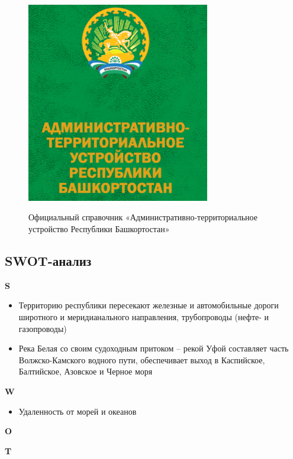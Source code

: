 \begin{figure}[h!]
	\begin{center}
		{\includegraphics[width=80mm]{pics/alina/spravka.png}}
		\caption{Официальный справочник «Административно-территориальное устройство Республики Башкортостан»}
	\end{center}
\end{figure}

\newpage

\subsection{SWOT-анализ}

\textbf{S}

\begin{itemize}
	\item Территорию республики пересекают железные и автомобильные дороги широтного и меридианального направления, трубопроводы (нефте- и газопроводы)
	\item Река Белая со своим судоходным притоком – рекой Уфой составляет часть Волжско-Камского водного пути, обеспечивает выход в Каспийское, Балтийское, Азовское и Черное моря
\end{itemize}

\textbf{W}

\begin{itemize}
	\item Удаленность от морей и океанов
\end{itemize}

\textbf{O}

\textbf{T}